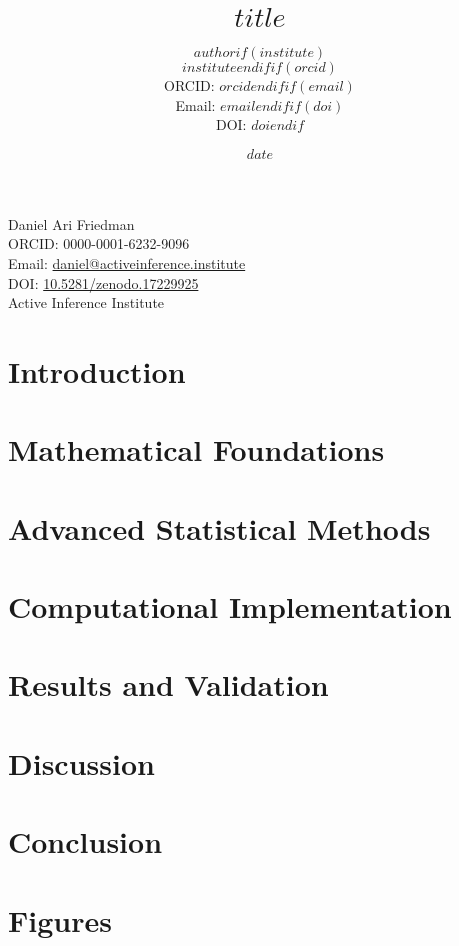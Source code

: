 \documentclass[11pt,a4paper]{article}
\title{$title$}
\author{$author$$if(institute)$ \\
       {\small $institute$}$endif$$if(orcid)$ \\
       {\small ORCID: $orcid$}$endif$$if(email)$ \\
       {\small Email: $email$}$endif$$if(doi)$ \\
       {\small DOI: \href{https://doi.org/$doi$}{$doi$}}$endif$}
\date{$date$}
\begin{document}
\maketitle
\vspace{-6mm}
\begin{center}
\begin{minipage}{0.9\textwidth}
\centering
\small
Daniel Ari Friedman\\
ORCID: 0000-0001-6232-9096\\
Email: \href{mailto:daniel@activeinference.institute}{daniel@activeinference.institute}\\
DOI: \href{https://doi.org/10.5281/zenodo.17229925}{10.5281/zenodo.17229925}\\
Active Inference Institute
\end{minipage}
\end{center}
\vspace{3mm}

\begin{abstract}

\end{abstract}

\tableofcontents
\newpage

\section{Introduction}


\section{Mathematical Foundations}


\section{Advanced Statistical Methods}


\section{Computational Implementation}


\section{Results and Validation}


\section{Discussion}


\section{Conclusion}


\section{Figures}




\end{document}
